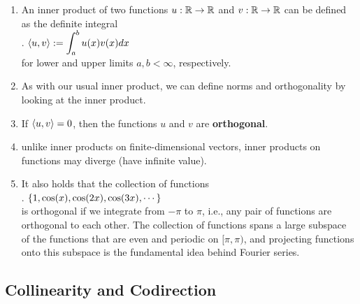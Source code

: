 \begin{enumerate}
    \item An inner product of two functions $u : \mathbb{R} \to \mathbb{R}$ and $v : \mathbb{R} \to \mathbb{R}$ can be defined as the definite integral
    \hfill \cite{mfml/book/mml/Deisenroth-Faisal-Ong}
    \\
    .\hfill
    $
        \langle u, v\rangle
        := \displaystyle\int^b_a u(x)v(x) dx
    $
    \hfill \cite{mfml/book/mml/Deisenroth-Faisal-Ong}
    \\
    for lower and upper limits $a, b < \infty$, respectively.
    \hfill \cite{mfml/book/mml/Deisenroth-Faisal-Ong}

    \item As with our usual inner product, we can define norms and orthogonality by looking at the inner product.
    \hfill \cite{mfml/book/mml/Deisenroth-Faisal-Ong}

    \item If $\langle u, v\rangle = 0$, then the functions $u$ and $v$ are \textbf{orthogonal}.
    \hfill \cite{mfml/book/mml/Deisenroth-Faisal-Ong}

    \item unlike inner products on finite-dimensional vectors, inner products on functions may diverge (have infinite value).
    \hfill \cite{mfml/book/mml/Deisenroth-Faisal-Ong}

    \item It also holds that the collection of functions
    \hfill \cite{mfml/book/mml/Deisenroth-Faisal-Ong}
    \\
    .\hfill
    $
        \left\{1, \cos(x), \cos(2x), \cos(3x), \cdots \right\}
    $
    \hfill \cite{mfml/book/mml/Deisenroth-Faisal-Ong}
    \\
    is orthogonal if we integrate from $-\pi$ to $\pi$, i.e., any pair of functions are orthogonal to each other.
    The collection of functions spans a large subspace of the functions that are even and periodic on $[\pi, \pi)$, and projecting functions onto this subspace is the fundamental idea behind Fourier series.
    \hfill \cite{mfml/book/mml/Deisenroth-Faisal-Ong}

    
\end{enumerate}










\subsection{Collinearity and Codirection}


